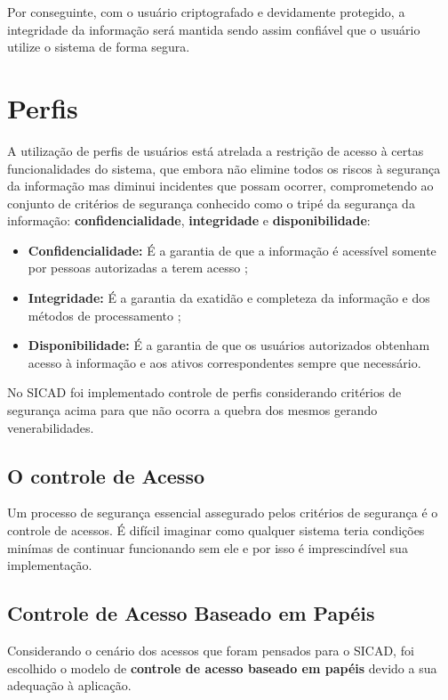\documentclass[12pt, a4paper]{report}
\begin{document}
Por conseguinte, com o usuário criptografado e devidamente protegido, a integridade da informação será mantida sendo assim confiável que o usuário utilize o sistema de forma segura.

\section{ Perfis}
A utilização de perfis de usuários está atrelada a restrição de acesso à certas funcionalidades do sistema, que embora não elimine todos os riscos à segurança da informação mas diminui incidentes que possam ocorrer, comprometendo ao conjunto de critérios de segurança conhecido como o tripé da segurança da informação: \textbf{confidencialidade}, \textbf{integridade} e \textbf{disponibilidade}:

\begin{itemize}
\item \textbf{Confidencialidade:} É a garantia de que a informação é acessível somente por pessoas autorizadas a terem acesso \cite{iso27002};
\item \textbf{Integridade:} É a garantia da exatidão e completeza da informação e dos métodos de processamento \cite{iso27002};
\item \textbf{Disponibilidade:} É a garantia de que os usuários autorizados obtenham acesso à informação e aos ativos correspondentes sempre  que necessário. \cite{iso27002}
\end{itemize}

No \ac{SICAD} foi implementado controle de perfis considerando critérios de segurança acima para que não ocorra a quebra dos mesmos gerando venerabilidades.

\subsection{O controle de Acesso}

Um processo de segurança essencial assegurado pelos critérios de segurança é o controle de acessos. É difícil imaginar como qualquer sistema teria condições minímas de continuar funcionando sem ele e por isso é imprescindível sua implementação.

\subsection{Controle  de  Acesso  Baseado  em  Papéis }

Considerando o cenário dos acessos que foram pensados para o \ac{SICAD}, foi escolhido o modelo de \textbf{controle  de  acesso  baseado  em  papéis} devido a sua adequação à aplicação.
\end{document}
